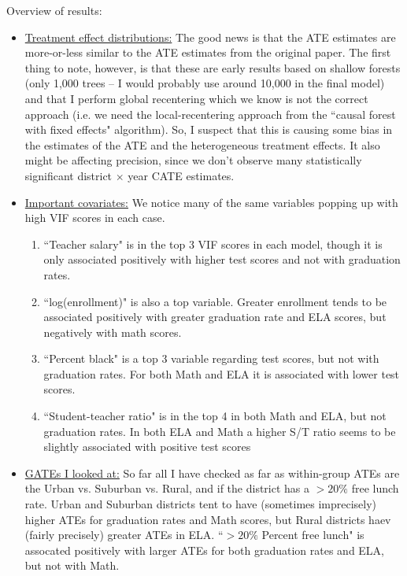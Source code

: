 \documentclass{article} %
\begin{document}
	Overview of results:
\begin{itemize}
	\item \underline{Treatment effect distributions:} The good news is that the ATE estimates are more-or-less similar to the ATE estimates from the original paper. The first thing to note, however, is that these are early results based on shallow forests (only 1,000 trees -- I would probably use around 10,000 in the final model) and that I perform global recentering which we know is not the correct approach (i.e. we need the local-recentering approach from the ``causal forest with fixed effects" algorithm). So, I suspect that this is causing some bias in the estimates of the ATE and the heterogeneous treatment effects. It also might be affecting precision, since we don't observe many statistically significant district $\times$ year CATE estimates.
	\item \underline{Important covariates:} We notice many of the same variables popping up with high VIF scores in each case.
	\begin{enumerate}
		\item ``Teacher salary" is in the top 3 VIF scores in each model, though it is only associated positively with higher test scores and not with graduation rates.
		\item ``log(enrollment)" is also a top variable. Greater enrollment tends to be associated positively with greater graduation rate and ELA scores, but negatively with math scores. 
		\item ``Percent black"  is a top 3 variable regarding test scores, but not with graduation rates. For both Math and ELA it is associated with lower test scores. 
		\item ``Student-teacher ratio" is in the top 4 in both Math and ELA, but not graduation rates. In both ELA and Math a higher S/T ratio seems to be slightly associated with positive test scores
	\end{enumerate}
	\item \underline{GATEs I looked at:} So far all I have checked as far as within-group ATEs are the Urban vs. Suburban vs. Rural, and if the district has a $> 20\%$ free lunch rate. Urban and Suburban districts tent to have (sometimes imprecisely) higher ATEs for graduation rates and Math scores, but Rural districts haev (fairly precisely) greater ATEs in ELA. ``$> 20\%$ Percent free lunch" is assocated positively with larger ATEs for both graduation rates and ELA, but not with Math. 
\end{itemize}
\end{document}
